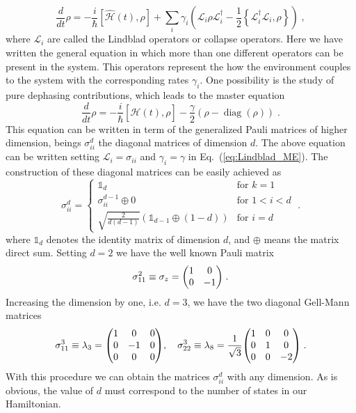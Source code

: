\begin{equation}
	\frac{d}{dt}\rho=-\frac{i}{\hbar}[\hat{\mathcal{H}}(t),\rho]+\sum_{i}\gamma_i\left(\mathcal{L}_i\rho\mathcal{L}^\dagger_i-\frac{1}{2}\left\{\mathcal{L}_i^\dagger\mathcal{L}_i,\rho\right\}\right)\; ,
	\label{eq:Lindblad_ME}
\end{equation}
where $\mathcal{L}_i$ are called the Lindblad operators or collapse operators. Here we have written the general equation in which more than one different operators can be present in the system. This operators represent the how the environment couples to the system with the corresponding rates $\gamma_i$. One possibility is the study of pure dephasing contributions, which leads to the master equation
\begin{equation}
	\frac{d}{dt}\rho=-\frac{i}{\hbar}[\hat{\mathcal{H}}(t),\rho]-\frac{\gamma}{2}(\rho-\operatorname{diag}(\rho))\; .
	\label{eq:dephasing_ME}
\end{equation}
This equation can be written in term of the generalized Pauli matrices of higher dimension, beings $\sigma_{ii}^d$ the diagonal matrices of dimension $d$. The above equation can be written setting $\mathcal{L}_i=\sigma_{ii}$ and $\gamma_{i}=\gamma$ in Eq.~(\ref{eq:Lindblad_ME}). The construction of these diagonal matrices can be easily achieved as
\begin{equation}
	\sigma_{ii}^d=\left\{\begin{array}{lr}
	\mathds{1}_d & \text{for } k=1\\
	\sigma_{ii}^{d-1}\oplus 0 & \text{for } 1<i<d\\
	\sqrt{\frac{2}{d(d-1)}}(\mathds{1}_{d-1}\oplus (1-d)) &\text{for } i=d
	\end{array}\right. \; .
	\label{eq:diagonal_matrices}
\end{equation}
where $\mathds{1}_d$ denotes the identity matrix of dimension $d$, and $\oplus$ means the matrix direct sum. Setting $d=2$ we have the well known Pauli matrix
\begin{equation}
	\sigma_{11}^2\equiv \sigma_z=\mqty(1 & 0 \\ 0 & -1)\; .
\end{equation}
Increasing the dimension by one, i.e. $d=3$, we have the two diagonal Gell-Mann matrices
\begin{equation}
	\sigma_{11}^3\equiv \lambda_3=\mqty(1 & 0 & 0 \\ 0 & -1 & 0 \\ 0 & 0 & 0), \quad \sigma_{22}^3\equiv \lambda_8=\frac{1}{\sqrt{3}}\mqty(1 & 0 & 0 \\ 0 & 1 & 0 \\ 0 & 0 & -2)\;.
\end{equation}
With this procedure we can obtain the matrices $\sigma_{ii}^d$ with any dimension. As  is obvious, the value of $d$ must correspond to the number of states in our Hamiltonian.\\


